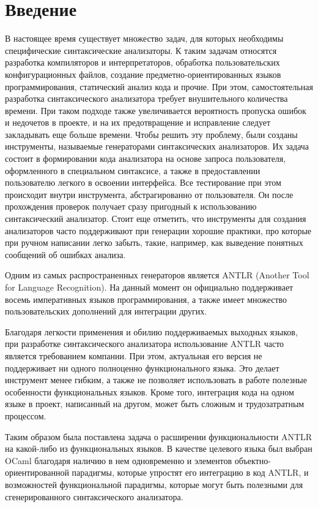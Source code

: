 
\section*{Введение}
\thispagestyle{withCompileDate}

В настоящее время существует множество задач, для которых необходимы специфические синтаксические анализаторы. 
К таким задачам относятся разработка компиляторов и интерпретаторов, обработка пользовательских конфигурационных файлов, создание предметно-ориентированных языков программирования, статический анализ кода и прочие. 
При этом, самостоятельная разработка синтаксического анализатора требует внушительного количества времени.
При таком подходе также увеличивается вероятность пропуска ошибок и недочетов в проекте, и на их предотвращение и исправление следует закладывать еще больше времени.
Чтобы решить эту проблему, были созданы инструменты, называемые генераторами синтаксических анализаторов. 
Их задача состоит в формировании кода анализатора на основе запроса пользователя, оформленного в специальном синтаксисе, а также в предоставлении пользователю легкого в освоении интерфейса. 
Все тестирование при этом происходит внутри инструмента, абстрагированно от пользователя.
Он после прохождения проверок получает сразу пригодный к использованию синтаксический анализатор.
Стоит еще отметить, что инструменты для создания анализаторов часто поддерживают при генерации хорошие практики, про которые при ручном написании легко забыть, такие, например, как выведение понятных сообщений об ошибках анализа.

Одним из самых распространенных генераторов является ANTLR (Another Tool for Language Recognition). 
На данный момент он официально поддерживает восемь императивных языков программирования, а также имеет множество пользовательских дополнений для интеграции других. 

Благодаря легкости применения и обилию поддерживаемых выходных языков, при разработке синтаксического анализатора использование ANTLR часто является требованием компании. 
При этом, актуальная его версия не поддерживает ни одного полноценно функционального языка. 
Это делает инструмент менее гибким, а также не позволяет использовать в работе полезные особенности функциональных языков.
Кроме того, интеграция кода на одном языке в проект, написанный на другом, может быть сложным и трудозатратным процессом.

Таким образом была поставлена задача о расширении функциональности ANTLR на какой-либо из функциональных языков. 
В качестве целевого языка был выбран OCaml благодаря наличию в нем одновременно и элементов объектно-ориентированной парадигмы, которые упростят его интеграцию в код ANTLR, 
и возможностей функциональной парадигмы, которые могут быть полезными для сгенерированного синтаксического анализатора. 
